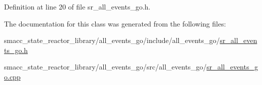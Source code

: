 Definition at line 20 of file sr\+\_\+all\+\_\+events\+\_\+go.\+h.



The documentation for this class was generated from the following files\+:\begin{DoxyCompactItemize}
\item 
smacc\+\_\+state\+\_\+reactor\+\_\+library/all\+\_\+events\+\_\+go/include/all\+\_\+events\+\_\+go/\hyperlink{sr__all__events__go_8h}{sr\+\_\+all\+\_\+events\+\_\+go.\+h}\item 
smacc\+\_\+state\+\_\+reactor\+\_\+library/all\+\_\+events\+\_\+go/src/all\+\_\+events\+\_\+go/\hyperlink{sr__all__events__go_8cpp}{sr\+\_\+all\+\_\+events\+\_\+go.\+cpp}\end{DoxyCompactItemize}
